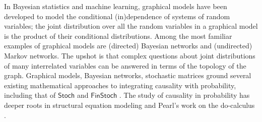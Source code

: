 \documentclass{article}
\theoremstyle{definition}
\newcommand{\redout}[1]{{\color{red}#1}}
\newcommand{\Cat}[1]{\mathsf{#1}}
\def\Stoch{\Cat{Stoch}}
\def\FinStoch{\Cat{FinStoch}}
\begin{document}
In Bayesian statistics and machine learning, graphical models have been developed to model the conditional (in)dependence of systems of random variables; the joint distribution over all the random variables in a graphical model is the product of their conditional distributions. Among the most familiar examples of graphical models are (directed) Bayesian networks and (undirected) Markov networks. The upshot is that complex questions about joint distributions of many interrelated variables can be answered in terms of the topology of the graph. Graphical models, Bayesian networks, stochastic matrices ground several existing mathematical approaches to integrating causality with probability, including that of $\Stoch$ and $\FinStoch$ \cite{coecke}. The study of causality in probability has deeper roots in structural equation modeling and Pearl's work on the do-calculus \cite{pearl09}. %



\end{document}
